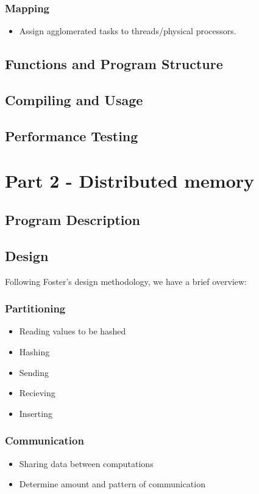 \documentclass{article}
\begin{document}
\subsubsection{Mapping}
        \begin{itemize}
            \item Assign agglomerated tasks to threads/physical processors.
        \end{itemize}


\subsection{Functions and Program Structure}


\subsection{Compiling and Usage}


\subsection{Performance Testing}


\section{Part 2 - Distributed memory}
\subsection{Program Description}

\subsection{Design}
Following Foster's design methodology, we have a brief overview:

\subsubsection{Partitioning}
        \begin{itemize}
            \item Reading values to be hashed
            \item Hashing
            \item Sending
            \item Recieving
            \item Inserting
        \end{itemize}
\subsubsection{Communication}
        \begin{itemize}
            \item Sharing data between computations
            \item Determine amount and pattern of communication
        \end{itemize}
\end{document}
